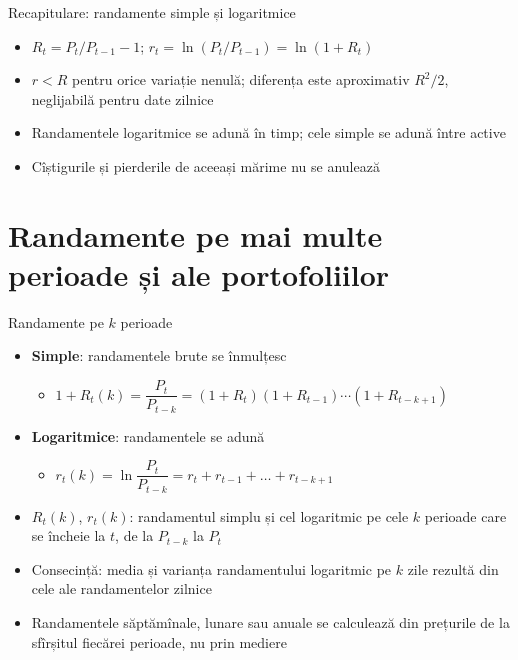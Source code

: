 \begin{frame}{Recapitulare: randamente simple și logaritmice}
\itemsize{\small}
\begin{itemize}
    \item $R_t = P_t/P_{t-1} - 1$; $r_t = \ln(P_t/P_{t-1}) = \ln(1 + R_t)$
    \item $r < R$ pentru orice variație nenulă; diferența este aproximativ $R^2/2$, neglijabilă pentru date zilnice
    \item Randamentele logaritmice se adună în timp; cele simple se adună între active
    \item Cîștigurile și pierderile de aceeași mărime nu se anulează
\end{itemize}
\end{frame}


\section{Randamente pe mai multe perioade și ale portofoliilor}

\begin{frame}{Randamente pe $k$ perioade}
\itemsize{\small}
\begin{itemize}
    \item \textbf{Simple}: randamentele brute se înmulțesc
    \begin{itemize}
        \item $1 + R_t(k) = \dfrac{P_t}{P_{t-k}} = (1 + R_t)(1 + R_{t-1}) \cdots (1 + R_{t-k+1})$
    \end{itemize}
    \item \textbf{Logaritmice}: randamentele se adună
    \begin{itemize}
        \item $r_t(k) = \ln\dfrac{P_t}{P_{t-k}} = r_t + r_{t-1} + \dots + r_{t-k+1}$
    \end{itemize}
    \item $R_t(k)$, $r_t(k)$: randamentul simplu și cel logaritmic pe cele $k$ perioade care se încheie la $t$, de la $P_{t-k}$ la $P_t$
    \item Consecință: media și varianța randamentului logaritmic pe $k$ zile rezultă din cele ale randamentelor zilnice
    \item Randamentele săptămînale, lunare sau anuale se calculează din prețurile de la sfîrșitul fiecărei perioade, nu prin mediere
\end{itemize}
\end{frame}

